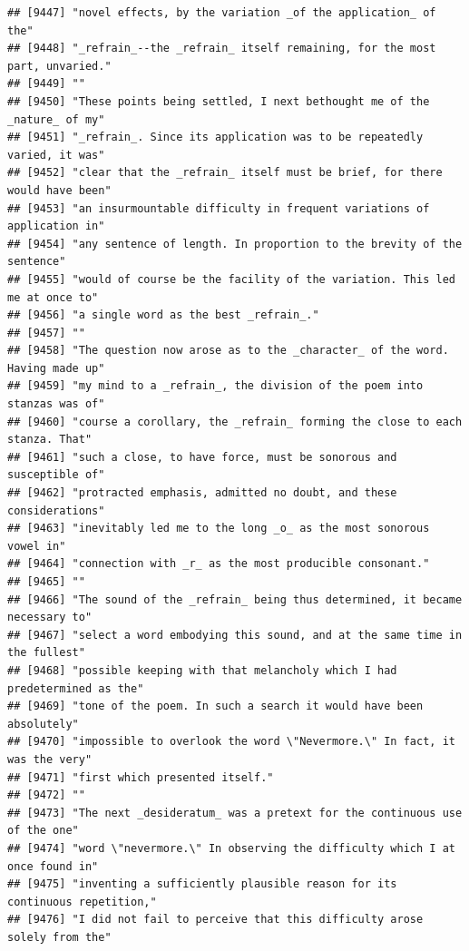 \documentclass{article}\usepackage[]{graphicx}\usepackage[]{color}
\makeatletter
\newenvironment{kframe}{%
 \def\at@end@of@kframe{}%
 \ifinner\ifhmode%
  \def\at@end@of@kframe{\end{minipage}}%
  \begin{minipage}{\columnwidth}%
 \fi\fi%
 \def\FrameCommand##1{\hskip\@totalleftmargin \hskip-\fboxsep
 \colorbox{shadecolor}{##1}\hskip-\fboxsep
     \hskip-\linewidth \hskip-\@totalleftmargin \hskip\columnwidth}%
 \MakeFramed {\advance\hsize-\width
   \@totalleftmargin\z@ \linewidth\hsize
   \@setminipage}}%
 {\par\unskip\endMakeFramed%
 \at@end@of@kframe}
\newenvironment{knitrout}{}{} %
\makeatother
\begin{document}
\begin{knitrout}
\begin{kframe}
\begin{verbatim}
## [9447] "novel effects, by the variation _of the application_ of the"                 
## [9448] "_refrain_--the _refrain_ itself remaining, for the most part, unvaried."     
## [9449] ""                                                                            
## [9450] "These points being settled, I next bethought me of the _nature_ of my"       
## [9451] "_refrain_. Since its application was to be repeatedly varied, it was"        
## [9452] "clear that the _refrain_ itself must be brief, for there would have been"    
## [9453] "an insurmountable difficulty in frequent variations of application in"       
## [9454] "any sentence of length. In proportion to the brevity of the sentence"        
## [9455] "would of course be the facility of the variation. This led me at once to"    
## [9456] "a single word as the best _refrain_."                                        
## [9457] ""                                                                            
## [9458] "The question now arose as to the _character_ of the word. Having made up"    
## [9459] "my mind to a _refrain_, the division of the poem into stanzas was of"        
## [9460] "course a corollary, the _refrain_ forming the close to each stanza. That"    
## [9461] "such a close, to have force, must be sonorous and susceptible of"            
## [9462] "protracted emphasis, admitted no doubt, and these considerations"            
## [9463] "inevitably led me to the long _o_ as the most sonorous vowel in"             
## [9464] "connection with _r_ as the most producible consonant."                       
## [9465] ""                                                                            
## [9466] "The sound of the _refrain_ being thus determined, it became necessary to"    
## [9467] "select a word embodying this sound, and at the same time in the fullest"     
## [9468] "possible keeping with that melancholy which I had predetermined as the"      
## [9469] "tone of the poem. In such a search it would have been absolutely"            
## [9470] "impossible to overlook the word \"Nevermore.\" In fact, it was the very"     
## [9471] "first which presented itself."                                               
## [9472] ""                                                                            
## [9473] "The next _desideratum_ was a pretext for the continuous use of the one"      
## [9474] "word \"nevermore.\" In observing the difficulty which I at once found in"    
## [9475] "inventing a sufficiently plausible reason for its continuous repetition,"    
## [9476] "I did not fail to perceive that this difficulty arose solely from the"       

\end{verbatim}
\end{kframe}
\end{knitrout}
\end{document}
